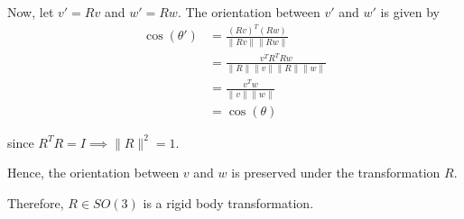 Now, let \(v' = R v\) and \(w' = R w\). The orientation between \(v'\) and \(w'\) is given by
\begin{align*}
    \cos(\theta')
     & = \frac{{(R v)}^{T} (R w)}{\lVert R v \rVert \lVert R w \rVert}
    \\ & = \frac{v^{T} R^{T} R w}{\lVert R \rVert \lVert v \rVert \lVert R \rVert \lVert w \rVert}
    \\ & = \frac{v^{T} w}{\lVert v \rVert \lVert w \rVert}
    \\ & = \cos(\theta)
\end{align*}

since \(R^{T} R = I \implies \lVert R \rVert^2 = 1\).

Hence, the orientation between \(v\) and \(w\) is preserved under the transformation \(R\).

Therefore, \(R \in S O(3)\) is a rigid body transformation.
